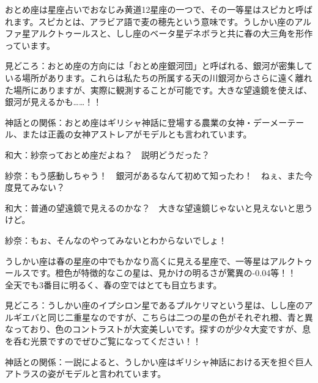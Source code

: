 \documentclass[../../super_nova_2023]{subfiles}
\begin{document}
\phantom{a}\par
{}
{}
\begin{tcolorbox}[title=2. おとめ座, breakable]
	おとめ座は星座占いでおなじみ黄道12星座の一つで、その一等星はスピカと呼ばれます。スピカとは、アラビア語で麦の穂先という意味です。うしかい座のアルファ星アルクトゥールスと、しし座のベータ星デネボラと共に春の大三角を形作っています。
	
	
	\phantom{a}\par
	見どころ：おとめ座の方向には「おとめ座銀河団」と呼ばれる、銀河が密集している場所があります。これらは私たちの所属する天の川銀河からさらに遠く離れた場所にありますが、実際に観測することが可能です。大きな望遠鏡を使えば、銀河が見えるかも……！！
	
	
	\phantom{a}\par
	神話との関係：おとめ座はギリシャ神話に登場する農業の女神・デーメーテール、または正義の女神アストレアがモデルとも言われています。  
\end{tcolorbox}

\phantom{a}\par
和大：紗奈っておとめ座だよね？　説明どうだった？


\phantom{a}\par
紗奈：もう感動しちゃう！　銀河があるなんて初めて知ったわ！　ねぇ、また今度見てみない？


\phantom{a}\par
和大：普通の望遠鏡で見えるのかな？　大きな望遠鏡じゃないと見えないと思うけど。


\phantom{a}\par
紗奈：もぉ、そんなのやってみないとわからないでしょ！


\phantom{a}\par
{}
{}
\begin{tcolorbox}[title=3. うしかい座, breakable]
	うしかい座は春の星座の中でもかなり高くに見える星座で、一等星はアルクトゥールスです。橙色が特徴的なこの星は、見かけの明るさが驚異の-0.04等！！　全天でも3番目に明るく、春の空ではとても目立ちます。
	
	
	\phantom{a}\par
	見どころ：うしかい座のイプシロン星であるプルケリマという星は、しし座のアルギエバと同じ二重星なのですが、こちらは二つの星の色がそれぞれ橙、青と異なっており、色のコントラストが大変美しいです。探すのが少々大変ですが、息を呑む光景ですのでぜひご覧になってください！！
	
	
	\phantom{a}\par
	神話との関係：一説によると、うしかい座はギリシャ神話における天を担ぐ巨人アトラスの姿がモデルと言われています。
\end{tcolorbox}
\end{document}
